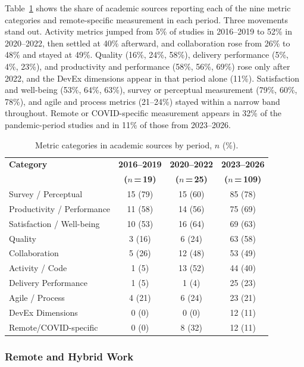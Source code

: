 \documentclass[preprint,number]{elsarticle}
\begin{document}
Table~\ref{tab:cat_period} shows the share of academic sources reporting each of the nine metric categories and remote-specific measurement in each period. Three movements stand out. Activity metrics jumped from 5\% of studies in 2016--2019 to 52\% in 2020--2022, then settled at 40\% afterward, and collaboration rose from 26\% to 48\% and stayed at 49\%. Quality (16\%, 24\%, 58\%), delivery performance (5\%, 4\%, 23\%), and productivity and performance (58\%, 56\%, 69\%) rose only after 2022, and the DevEx dimensions appear in that period alone (11\%). Satisfaction and well-being (53\%, 64\%, 63\%), survey or perceptual measurement (79\%, 60\%, 78\%), and agile and process metrics (21--24\%) stayed within a narrow band throughout. Remote or COVID-specific measurement appears in 32\% of the pandemic-period studies and in 11\% of those from 2023--2026.


\begin{table}[htbp]
\centering
\caption{Metric categories in academic sources by period, $n$ (\%).}
\label{tab:cat_period}
\footnotesize
\begin{tabular}{l c c c}
\toprule
\textbf{Category} & \textbf{2016--2019} & \textbf{2020--2022} & \textbf{2023--2026} \\
 & \textbf{($n$\,=\,19)} & \textbf{($n$\,=\,25)} & \textbf{($n$\,=\,109)} \\
\midrule
Survey / Perceptual        & 15 (79) & 15 (60) & 85 (78) \\
Productivity / Performance & 11 (58) & 14 (56) & 75 (69) \\
Satisfaction / Well-being   & 10 (53) & 16 (64) & 69 (63) \\
Quality                    & 3 (16)  & 6 (24)  & 63 (58) \\
Collaboration              & 5 (26)  & 12 (48) & 53 (49) \\
Activity / Code            & 1 (5)   & 13 (52) & 44 (40) \\
Delivery Performance       & 1 (5)   & 1 (4)   & 25 (23) \\
Agile / Process            & 4 (21)  & 6 (24)  & 23 (21) \\
DevEx Dimensions           & 0 (0)   & 0 (0)   & 12 (11) \\
\midrule
Remote/COVID-specific      & 0 (0)   & 8 (32)  & 12 (11) \\
\bottomrule
\end{tabular}
\end{table}

\subsubsection{Remote and Hybrid Work}
\end{document}
